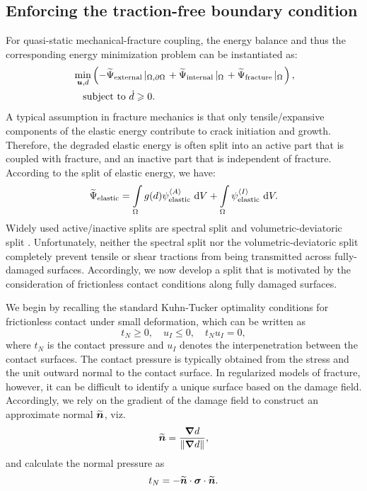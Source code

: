 \subsection{Enforcing the traction-free boundary condition}
For quasi-static mechanical-fracture coupling, the energy balance and thus the corresponding energy minimization problem can be instantiated as:
\begin{equation}
  \begin{aligned}
     & \min_{\boldsymbol{u},d} \left( -\widetilde{\Psi}_{\text{external}} \left\vert_{\Omega,{\partial \Omega}}\right. + \widetilde{\Psi}_{\text{internal}} \left\vert_{\Omega}\right. + \widetilde{\Psi}_{\text{fracture}} \left\vert_{\Omega}\right. \right) , \\
     & \quad \text{subject to } \Dot{d} \geqslant 0.
  \end{aligned}
\end{equation}
A typical assumption in fracture mechanics is that only tensile/expansive components of the elastic energy contribute to crack initiation and growth. Therefore, the degraded elastic energy is often split into an active part that is coupled with fracture, and an inactive part that is independent of fracture. According to the split of elastic energy, we have:
\begin{align}
  \widetilde{\Psi}_{\text{elastic}} = \int\limits_\Omega g(d)\psi_{\text{elastic}}^{\left< A \right>} \text{ d}V + \int\limits_\Omega \psi_{\text{elastic}}^{\left< I \right>} \text{ d}V .
\end{align}
Widely used active/inactive splits are spectral split \cite{miehe_2010_p1, miehe_2010_p2} and volumetric-deviatoric split \cite{amor_2009}.  Unfortunately, neither the spectral split nor the volumetric-deviatoric split completely prevent tensile or shear tractions from being transmitted across fully-damaged surfaces.  Accordingly, we now develop a split that is motivated by the consideration of frictionless contact conditions along fully damaged surfaces.

We begin by recalling the standard Kuhn-Tucker optimality conditions for frictionless contact under small deformation, which can be written as
\begin{equation}
  t_N \geqslant 0, \quad u_I \leqslant 0, \quad t_N u_I = 0,
\end{equation}
where $t_N$ is the contact pressure and $u_I$ denotes the interpenetration between the contact surfaces.  The contact pressure is typically obtained from the stress and the unit outward normal to the contact surface.  In regularized models of fracture, however, it can be difficult to identify a unique surface based on the damage field.  Accordingly, we rely on the gradient of the damage field to construct an approximate normal $\widetilde{\boldsymbol{n}}$, viz.
\begin{equation}
  \widetilde{\boldsymbol{n}} = \frac{\boldsymbol{\nabla} d}{ \left\lVert\boldsymbol{\nabla} d\right\rVert },
\end{equation}
and calculate the normal pressure as
\begin{equation}
  \label{eq: pressure}
  t_N = -\widetilde{\boldsymbol{n}}\cdot\boldsymbol{\sigma}\cdot\widetilde{\boldsymbol{n}}.
\end{equation}

